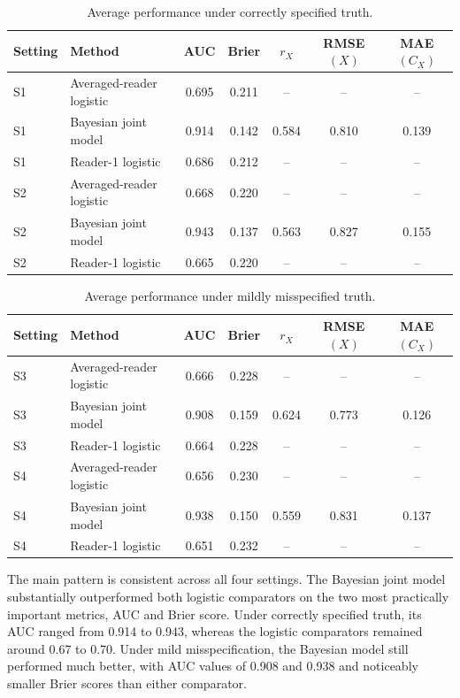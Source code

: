 \documentclass[twoside,11pt]{article}
\begin{document}
\begin{table}[H]
\centering
\small
\caption{Average performance under correctly specified truth.}
\begin{tabular}{llccccc}
\hline
Setting & Method & AUC & Brier & $r_X$ & RMSE$(X)$ & MAE$(C_X)$ \\
\hline
S1 & Averaged-reader logistic & 0.695 & 0.211 & -- & -- & -- \\
S1 & Bayesian joint model & 0.914 & 0.142 & 0.584 & 0.810 & 0.139 \\
S1 & Reader-1 logistic & 0.686 & 0.212 & -- & -- & -- \\
S2 & Averaged-reader logistic & 0.668 & 0.220 & -- & -- & -- \\
S2 & Bayesian joint model & 0.943 & 0.137 & 0.563 & 0.827 & 0.155 \\
S2 & Reader-1 logistic & 0.665 & 0.220 & -- & -- & -- \\
\hline
\end{tabular}
\end{table}

\begin{table}[H]
\centering
\small
\caption{Average performance under mildly misspecified truth.}
\begin{tabular}{llccccc}
\hline
Setting & Method & AUC & Brier & $r_X$ & RMSE$(X)$ & MAE$(C_X)$ \\
\hline
S3 & Averaged-reader logistic & 0.666 & 0.228 & -- & -- & -- \\
S3 & Bayesian joint model & 0.908 & 0.159 & 0.624 & 0.773 & 0.126 \\
S3 & Reader-1 logistic & 0.664 & 0.228 & -- & -- & -- \\
S4 & Averaged-reader logistic & 0.656 & 0.230 & -- & -- & -- \\
S4 & Bayesian joint model & 0.938 & 0.150 & 0.559 & 0.831 & 0.137 \\
S4 & Reader-1 logistic & 0.651 & 0.232 & -- & -- & -- \\
\hline
\end{tabular}
\end{table}

The main pattern is consistent across all four settings. The Bayesian joint model substantially outperformed both logistic comparators on the two most practically important metrics, AUC and Brier score. Under correctly specified truth, its AUC ranged from 0.914 to 0.943, whereas the logistic comparators remained around 0.67 to 0.70. Under mild misspecification, the Bayesian model still performed much better, with AUC values of 0.908 and 0.938 and noticeably smaller Brier scores than either comparator.
\end{document}
